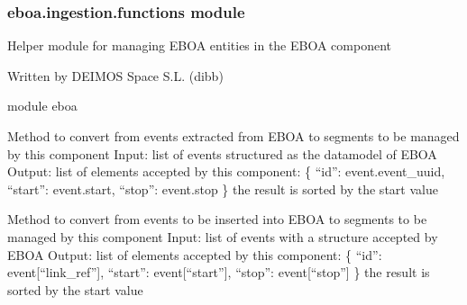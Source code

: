 \subsubsection{eboa.ingestion.functions module}
\label{\detokenize{eboa.ingestion:module-eboa.ingestion.functions}}\label{\detokenize{eboa.ingestion:eboa-ingestion-functions-module}}
Helper module for managing EBOA entities in the EBOA component

Written by DEIMOS Space S.L. (dibb)

module eboa

\begin{fulllineitems}
\label{\detokenize{eboa.ingestion:eboa.ingestion.functions.convert_eboa_events_to_date_segments}}
Method to convert from events extracted from EBOA to segments to be managed by this component
Input: list of events structured as the datamodel of EBOA
Output: list of elements accepted by this component:
\{
“id”: event.event\_uuid,
“start”: event.start,
“stop”: event.stop
\}
the result is sorted by the start value

\end{fulllineitems}


\begin{fulllineitems}
\label{\detokenize{eboa.ingestion:eboa.ingestion.functions.convert_input_events_to_date_segments}}
Method to convert from events to be inserted into EBOA to segments to be managed by this component
Input: list of events with a structure accepted by EBOA
Output: list of elements accepted by this component:
\{
“id”: event{[}“link\_ref”{]},
“start”: event{[}“start”{]},
“stop”: event{[}“stop”{]}
\}
the result is sorted by the start value

\end{fulllineitems}

